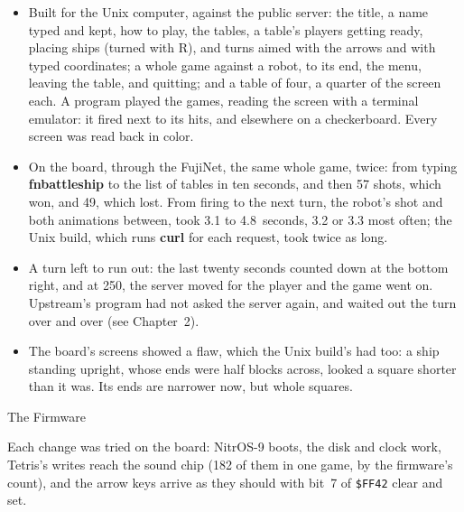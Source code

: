 \documentclass[10pt,twoside,openany]{book}
\makeatletter
\newcommand{\cmd}[1]{\textbf{#1}}            %
\newcommand{\file}[1]{\texttt{#1}}           %
\newcommand{\key}[1]{\textsf{\small #1}}     %
\renewcommand{\section}{\@startsection{section}{1}{0pt}{3.2ex plus 1ex}{1.2ex}%
  {\sffamily\bfseries\large}}
\makeatother
\begin{document}
\begin{itemize}\setlength{\itemsep}{0.3ex}
\item Built for the Unix computer, against the public server: the title,
a name typed and kept, how to play, the tables, a table's players getting
ready, placing ships (turned with \key{R}), and turns aimed with the
arrows and with typed coordinates; a whole game against a robot, to its
end, the menu, leaving the table, and quitting; and a table of four, a
quarter of the screen each. A program played the games, reading the
screen with a terminal emulator: it fired next to its hits, and
elsewhere on a checkerboard. Every screen was read back in color.
\item On the board, through the FujiNet, the same whole game, twice: from
typing \cmd{fnbattleship} to the list of tables in ten seconds, and then
57 shots, which won, and 49, which lost. From firing to the next turn, the
robot's shot and both animations between, took 3.1 to 4.8~seconds, 3.2
or 3.3 most often; the Unix build, which runs \cmd{curl} for each
request, took twice as long.
\item A turn left to run out: the last twenty seconds counted down at the
bottom right, and at 250, the server moved for the player and the game
went on. Upstream's program had not asked the server again, and waited
out the turn over and over (see Chapter~2).
\item The board's screens showed a flaw, which the Unix build's had too: a
ship standing upright, whose ends were half blocks across, looked a
square shorter than it was. Its ends are narrower now, but whole
squares.
\end{itemize}

\section{The Firmware}

Each change was tried on the board: NitrOS-9 boots, the disk and clock
work, Tetris's writes reach the sound chip (182 of them in one game, by
the firmware's count), and the arrow keys arrive as they should with bit~7
of \file{\$FF42} clear and set.
\end{document}
